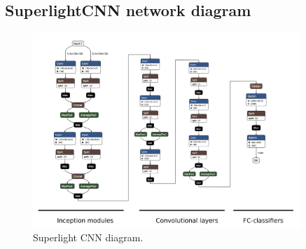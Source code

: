 \documentclass[11pt, a4paper]{article}
\numberwithin{equation}{subsection}
\begin{document}
\begin{appendices}
\section{SuperlightCNN network diagram}
\begin{figure}[H]
  \centering
  \includegraphics[width=0.9\textwidth]{images/V4_model.png}
  \caption{Superlight CNN diagram.}
  \label{fig:superlight_cnn}
\end{figure}


\end{appendices}
\end{document}
